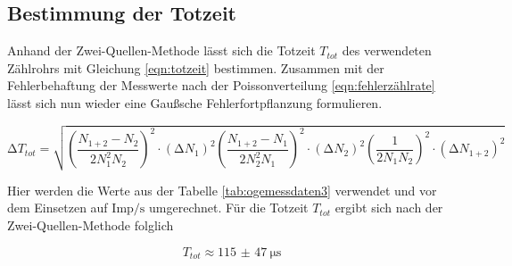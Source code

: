 \subsection{Bestimmung der Totzeit}
Anhand der Zwei-Quellen-Methode lässt sich die Totzeit $T_{tot}$ des verwendeten Zählrohrs mit Gleichung \eqref{eqn:totzeit} bestimmen.
Zusammen mit der Fehlerbehaftung der Messwerte nach der Poissonverteilung \eqref{eqn:fehlerzählrate} lässt sich nun wieder eine
Gaußsche Fehlerfortpflanzung formulieren.

\begin{equation*}
\increment T_{tot} = \sqrt{\left( \frac{N_{1+2} - N_{2}}{2 N_{1}^{2} N_{2}}\right)^2 \cdot (\increment N_{1})^{2} 
\left( \frac{N_{1+2} - N_{1}}{2 N_{2}^{2} N_{1}}\right)^2 \cdot (\increment N_{2})^{2} 
\left( \frac{1}{2 N_{1} N_{2}}\right)^2 \cdot (\increment N_{1+2})^{2}} 
\end{equation*}

Hier werden die Werte aus der Tabelle \ref{tab:ogemessdaten3} verwendet und vor dem Einsetzen auf $\text{Imp} / \si{\second}$ umgerechnet.
Für die Totzeit $T_{tot}$ ergibt sich nach der Zwei-Quellen-Methode folglich

\begin{equation}
T_{tot} \approx \SI{115(47)}{\micro\second}
\end{equation}